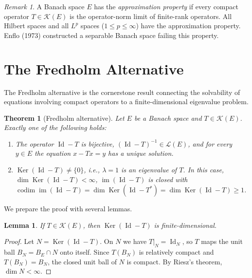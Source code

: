 \documentclass[a4paper,12pt]{book}
\DeclareMathOperator{\im}{im}
\DeclareMathOperator{\Id}{Id}
\DeclareMathOperator{\Ker}{Ker}
\DeclareMathOperator{\codim}{codim}
\theoremstyle{definition}
\theoremstyle{plain}
\newtheorem{theorem}[definition]{Theorem}
\newtheorem{lemma}[definition]{Lemma}
\theoremstyle{remark}
\newtheorem{remark}[definition]{Remark}
\begin{document}
\begin{remark}\label{rem:approx-property}
A Banach space $E$ has the \emph{approximation property} if every compact operator
$T \in \mathcal{K}(E)$ is the operator-norm limit of finite-rank operators. All
Hilbert spaces and all $L^p$ spaces ($1 \le p \le \infty$) have the approximation
property. Enflo (1973) constructed a separable Banach
space failing this property.
\end{remark}

\section{The Fredholm Alternative}\label{sec:fredholm-alt}


The Fredholm alternative is the cornerstone result connecting the solvability of
equations involving compact operators to a finite-dimensional eigenvalue problem.

\begin{theorem}[Fredholm alternative]\label{thm:fredholm-alt}
Let $E$ be a Banach space and $T \in \mathcal{K}(E)$. Exactly one of the
following holds:
\begin{enumerate}[label=(\alph*)]
  \item The operator $\Id - T$ is bijective, $(\Id - T)^{-1} \in \mathcal{L}(E)$,
        and for every $y \in E$ the equation $x - Tx = y$ has a unique solution.
  \item $\Ker(\Id - T) \ne \{0\}$, i.e., $\lambda = 1$ is an eigenvalue of $T$.
        In this case, $\dim \Ker(\Id - T) < \infty$,
        $\im(\Id - T)$ is closed with
        $\codim \im(\Id - T) = \dim \Ker(\Id - T^*) = \dim \Ker(\Id - T) \ge 1$.
\end{enumerate}
\end{theorem}

We prepare the proof with several lemmas.

\begin{lemma}\label{lem:kernel-finite-dim}
If $T \in \mathcal{K}(E)$, then $\Ker(\Id - T)$ is finite-dimensional.
\end{lemma}

\begin{proof}
Let $N = \Ker(\Id - T)$. On $N$ we have $T|_N = \Id_N$, so $T$ maps
the unit ball $B_N = B_E \cap N$ onto itself. Since $T(B_N)$ is relatively compact
and $T(B_N) = B_N$, the closed unit ball of $N$ is compact. By Riesz's
theorem, $\dim N < \infty$.
\end{proof}
\end{document}
